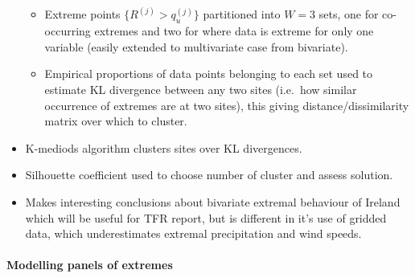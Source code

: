 \documentclass{article}
\numberwithin{equation}{section}
\begin{document}
\begin{itemize}
\begin{itemize}
  \item Extreme points $\{R^{(j)} > q_u^{(j)}\}$ partitioned into $W = 3$ sets, one for co-occurring extremes and two for where data is extreme for only one variable (easily extended to multivariate case from bivariate).
  \item Empirical proportions of data points belonging to each set used to estimate KL divergence between any two sites (i.e.\ how similar occurrence of extremes are at two sites), this giving distance/dissimilarity matrix over which to cluster.
  \end{itemize}
  \item K-mediods algorithm clusters sites over KL divergences. 
  \item Silhouette coefficient used to choose number of cluster and assess solution. 
  \item Makes interesting conclusions about bivariate extremal behaviour of Ireland which will be useful for TFR report, but is different in it's use of gridded data, which underestimates extremal precipitation and wind speeds. 
\end{itemize}



\paragraph{Modelling panels of extremes}
\end{document}
